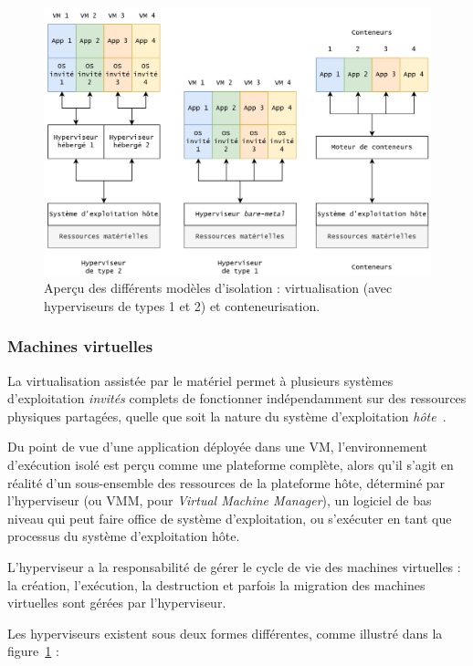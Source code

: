 \begin{figure}[!ht]
    \centering
	\includegraphics[width=\textwidth]{2_Chapitre2/figures/virtualization.png}
	\caption{Aperçu des différents modèles d'isolation : virtualisation (avec hyperviseurs de types 1 et 2) et conteneurisation.}
	\label{figure:context-virtualization}
\end{figure}

\subsubsection{Machines virtuelles}

La virtualisation assistée par le matériel permet à plusieurs systèmes d'exploitation \textit{invités} complets de fonctionner indépendamment sur des ressources physiques partagées, quelle que soit la nature du système d'exploitation \textit{hôte}~\cite{kivityKvmLinuxVirtual}.

Du point de vue d'une application déployée dans une VM, l'environnement d'exécution isolé est perçu comme une plateforme complète, alors qu'il s'agit en réalité d'un sous-ensemble des ressources de la plateforme hôte, déterminé par l'hyperviseur (ou \gls{VMM}, pour \textit{Virtual Machine Manager}), un logiciel de bas niveau qui peut faire office de système d'exploitation, ou s'exécuter en tant que processus du système d'exploitation hôte.

L'hyperviseur a la responsabilité de gérer le cycle de vie des machines virtuelles : la création, l'exécution, la destruction et parfois la migration des machines virtuelles sont gérées par l'hyperviseur.

Les hyperviseurs existent sous deux formes différentes, comme illustré dans la figure~\ref{figure:context-virtualization} :


